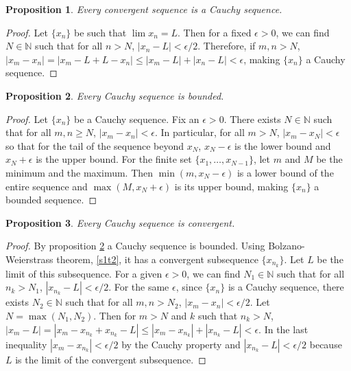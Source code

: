 \documentclass{article}
\theoremstyle{plain}
\numberwithin{thm}{section}
\theoremstyle{plain}
\newtheorem{prop}{Proposition}
\numberwithin{prop}{section}
\theoremstyle{definition}
\numberwithin{defn}{section}
\theoremstyle{remark}
\numberwithin{equation}{section}
\begin{document}
\begin{prop}\label{s1p2}
Every convergent sequence is a Cauchy sequence.
\end{prop}
\begin{proof}
Let $\{x_n\}$ be such that $\lim x_n = L$. Then for a fixed $\epsilon > 0$, we
can find $N \in \mathbb{N}$ such that for all $n > N$, $|x_n - L| < \epsilon/2$.
Therefore, if $m, n > N$, $|x_m - x_n| = |x_m - L + L - x_n| \le |x_m - L| + 
|x_n - L| < \epsilon$, making $\{x_n\}$ a Cauchy sequence.
\end{proof}

\begin{prop}\label{s1p3}
Every Cauchy sequence is bounded.
\end{prop}
\begin{proof}
Let $\{x_n\}$ be a Cauchy sequence. Fix an $\epsilon > 0$. There exists $N \in
\mathbb{N}$ such that for all $m, n \ge N$, $|x_m - x_n| < \epsilon$. In 
particular, for all $m > N$, $|x_m - x_N| < \epsilon$ so that for the tail of
the sequence beyond $x_N$, $x_N - \epsilon$ is the lower bound and $x_N +
\epsilon$ is the upper bound. For the finite set $\{x_1, \ldots, x_{N-1}\}$, let
$m$ and $M$ be the minimum and the maximum. Then $\min(m, x_N - \epsilon)$ is
a lower bound of the entire sequence and $\max(M, x_N + \epsilon)$ is its upper
bound, making $\{x_n\}$ a bounded sequence.
\end{proof}

\begin{prop}\label{s1p4}
Every Cauchy sequence is convergent.
\end{prop}
\begin{proof}
By proposition \ref{s1p3} a Cauchy sequence is bounded. Using Bolzano-Weierstrass
theorem, \ref{s1t2}, it has a convergent subsequence $\{x_{n_k}\}$. Let $L$ be
the limit of this subsequence. For a given $\epsilon > 0$, we can find $N_1 \in
\mathbb{N}$ such that for all $n_k > N_1$, $|x_{n_k} - L| < \epsilon/2$. For the
same $\epsilon$, since $\{x_n\}$ is a Cauchy sequence, there exists $N_2 \in
\mathbb{N}$ such that for all $m, n > N_2$, $|x_m - x_n| < \epsilon/2$. Let
$N = \max(N_1, N_2)$. Then for $m > N$ and $k$ such that $n_k > N$, $|x_m - L| 
= |x_m - x_{n_k} + x_{n_k} - L| \le |x_m - x_{n_k}| + |x_{n_k} - L| < \epsilon$.
In the last inequality $|x_m - x_{n_k}| < \epsilon/2$ by the Cauchy property
and $|x_{n_k} - L| < \epsilon/2$ because $L$ is the limit of the convergent
subsequence.
\end{proof}
\end{document}
